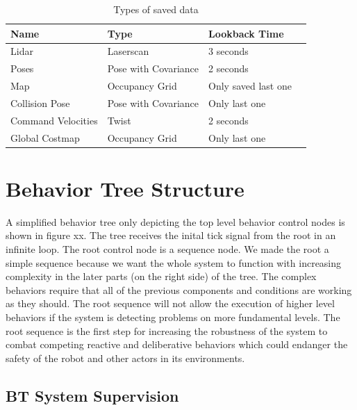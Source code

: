 \begin{table}[h!]
	\caption{Types of saved data}
	\begin{tabular}{ | m{} | m{}| m{} | m{} |} 
  	\hline
  	Name & Type & Lookback Time \\ 
  	\hline
  	Lidar & Laserscan & 3 seconds \\
  	\hline
  	Poses & Pose with Covariance & 2 seconds\\ 
  	\hline
  	Map & Occupancy Grid & Only saved last one \\ 
  	\hline
  	Collision Pose & Pose with Covariance & Only last one \\
  	\hline
  	Command Velocities & Twist & 2 seconds\\
  	\hline  	
  	Global Costmap & Occupancy Grid & Only last one \\
  	\hline
	\end{tabular}
\end{table}

\section{Behavior Tree Structure}

A simplified behavior tree only depicting the top level behavior control nodes is shown in figure xx. The tree receives the inital tick signal from the root in an infinite loop. The root control node is a sequence node. We made the root a simple sequence because we want the whole system to function with increasing complexity in the later parts (on the right side) of the tree. The complex behaviors require that all of the previous components and conditions are working as they should. The root sequence will not allow the execution of higher level behaviors if the system is detecting problems on more fundamental levels. The root sequence is the first step for increasing the robustness of the system to combat competing reactive and deliberative behaviors which could endanger the safety of the robot and other actors in its environments. 

\subsection{BT System Supervision}

